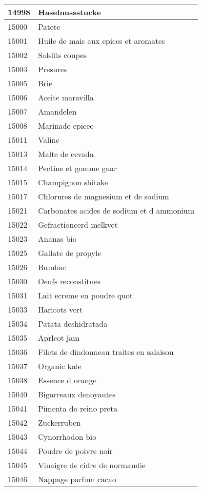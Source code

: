 \begin{longtable}{|l|l|}
14998 & Haselnussstucke \\ \hline 
15000 & Patete \\ \hline 
15001 & Huile de mais aux epices et aromates \\ \hline 
15002 & Salsifis coupes \\ \hline 
15003 & Presures \\ \hline 
15005 & Brie \\ \hline 
15006 & Aceite maravilla \\ \hline 
15007 & Amandelen \\ \hline 
15008 & Marinade epicee \\ \hline 
15011 & Valine \\ \hline 
15013 & Malte de cevada \\ \hline 
15014 & Pectine et gomme guar \\ \hline 
15015 & Champignon shitake \\ \hline 
15017 & Chlorures de magnesium et de sodium \\ \hline 
15021 & Carbonates acides de sodium et d ammonium \\ \hline 
15022 & Gefractioneerd melkvet \\ \hline 
15023 & Ananas bio \\ \hline 
15025 & Gallate de propyle \\ \hline 
15026 & Bumbac \\ \hline 
15030 & Oeufs reconstitues \\ \hline 
15031 & Lait ecreme en poudre quot \\ \hline 
15033 & Haricots vert \\ \hline 
15034 & Patata deshidratada \\ \hline 
15035 & Aprlcot jam \\ \hline 
15036 & Filets de dindonneau traites en salaison \\ \hline 
15037 & Organic kale \\ \hline 
15038 & Essence d orange \\ \hline 
15040 & Bigarreaux denoyautes \\ \hline 
15041 & Pimenta do reino preta \\ \hline 
15042 & Zuckerruben \\ \hline 
15043 & Cynorrhodon bio \\ \hline 
15044 & Poudre de poivre noir \\ \hline 
15045 & Vinaigre de cidre de normandie \\ \hline 
15046 & Nappage parfum cacao \\ \hline 

\end{longtable}
